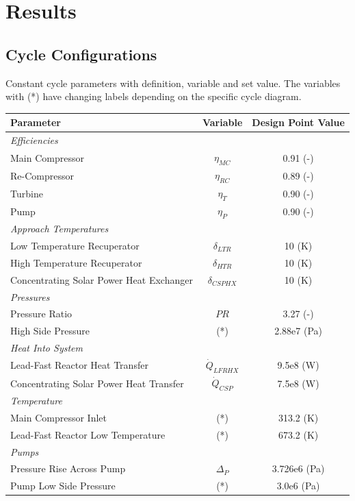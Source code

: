 \section{Results}


\subsection{Cycle Configurations} %

\begin{specialtable}[H] 
    \caption{Constant cycle parameters with definition, variable and set value. The variables with (*) have changing labels depending on the specific cycle diagram. \label{cycle-constants}}
    \begin{tabular}{lcc}
    \toprule
    \textbf{Parameter} & \textbf{Variable}	& \textbf{Design Point Value}\\
    \midrule
    \textit{Efficiencies}\\
    Main Compressor & $\eta_{MC}$		& 0.91 (-)\\
    Re-Compressor & $\eta_{RC}$		& 0.89 (-)\\
    Turbine & $\eta_{T}$		& 0.90 (-)\\
    Pump & $\eta_{P}$      & 0.90 (-)\\
    \midrule
    \textit{Approach Temperatures}\\
    Low Temperature Recuperator & $\delta_{LTR}$		& 10 (K)\\
    High Temperature Recuperator & $\delta_{HTR}$		& 10 (K)\\
    Concentrating Solar Power Heat Exchanger & $\delta_{CSPHX}$	& 10 (K)\\
    \midrule
    \textit{Pressures}\\
    Pressure Ratio & $PR$ & 3.27 (-)\\
    High Side Pressure & (*) & 2.88e7 (Pa)\\
    \midrule
    \textit{Heat Into System}\\
    Lead-Fast Reactor Heat Transfer & $\dot{Q}_{LFRHX}$ & 9.5e8 (W)\\
    Concentrating Solar Power Heat Transfer & $\dot{Q}_{CSP}$ & 7.5e8 (W)\\
    \midrule
    \textit{Temperature}\\
    Main Compressor Inlet & (*) & 313.2 (K)\\
    Lead-Fast Reactor Low Temperature & (*) & 673.2 (K)\\
    \midrule
    \textit{Pumps}\\
    Pressure Rise Across Pump & $\Delta_{P}$ & 3.726e6 (Pa)\\
    Pump Low Side Pressure & (*) & 3.0e6 (Pa)\\ 
    \bottomrule
    \end{tabular}
\end{specialtable}

